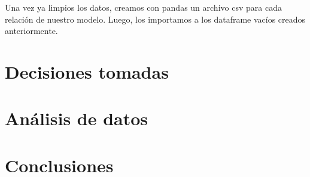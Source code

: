\documentclass[10pt,a4paper]{article}
\begin{document}
Una vez ya limpios los datos, creamos con pandas un archivo csv para cada relación de nuestro modelo. Luego, los importamos 
a los dataframe vacíos creados anteriormente.

\section{Decisiones tomadas}


\section{Análisis de datos}


\section{Conclusiones}
\end{document}
